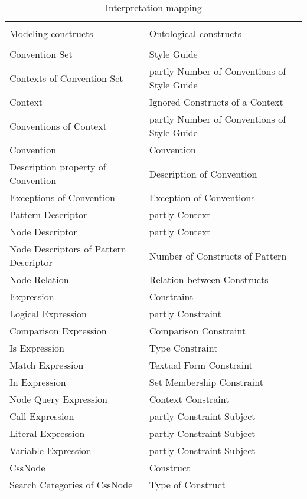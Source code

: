 \documentclass[parskip=full]{uvamscse}
\begin{document}
\begin{center}
\begin{longtable}{ | p{20em} | p{20em} | } 
\caption{Interpretation mapping}
\label{tab:interpretation}\\
\hline
 &  \\
Modeling constructs & Ontological constructs  \\
 &  \\
\hline

Convention Set & Style Guide \\ \hline
Contexts of Convention Set & partly Number of Conventions of Style Guide \\ \hline
Context & Ignored Constructs of a Context \\ \hline
Conventions of Context & partly Number of Conventions of Style Guide \\ \hline
Convention & Convention \\ \hline
Description property of Convention & Description of Convention \\ \hline
Exceptions of Convention & Exception of Conventions \\ \hline
Pattern Descriptor & partly Context \\ \hline
Node Descriptor & partly Context \\ \hline
Node Descriptors of Pattern Descriptor & Number of Constructs of Pattern \\ \hline
Node Relation & Relation between Constructs \\ \hline
Expression & Constraint \\ \hline
Logical Expression & partly Constraint \\ \hline
Comparison Expression & Comparison Constraint \\ \hline
Is Expression & Type Constraint \\ \hline
Match Expression & Textual Form Constraint \\ \hline
In Expression & Set Membership Constraint \\ \hline
Node Query Expression & Context Constraint \\ \hline
Call Expression & partly Constraint Subject \\ \hline
Literal Expression & partly Constraint Subject \\ \hline
Variable Expression & partly Constraint Subject \\ \hline
CssNode & Construct \\ \hline
Search Categories of CssNode & Type of Construct \\ \hline

\end{longtable}
\end{center}
\end{document}
